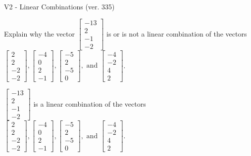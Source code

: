 \begin{exercise}
  \begin{exerciseTitle}V2 - Linear Combinations (ver. 335)\end{exerciseTitle}
  \begin{exerciseStatement}
    Explain why the vector \(\left[\begin{array}{c}
-13 \\
2 \\
-1 \\
-2
\end{array}\right]\)  is or is not a linear 
	combination of the vectors \(\left[\begin{array}{c}
2 \\
2 \\
-2 \\
-2
\end{array}\right] , \left[\begin{array}{c}
-4 \\
0 \\
2 \\
-1
\end{array}\right] , \left[\begin{array}{c}
-5 \\
2 \\
-5 \\
0
\end{array}\right] , \text{ and } \left[\begin{array}{c}
-4 \\
-2 \\
4 \\
2
\end{array}\right]\).
	


  \end{exerciseStatement}
  \begin{exerciseAnswer}
   \(\left[\begin{array}{c}
-13 \\
2 \\
-1 \\
-2
\end{array}\right]\) 
  	 is  
	a linear combination of the vectors \(\left[\begin{array}{c}
2 \\
2 \\
-2 \\
-2
\end{array}\right] , \left[\begin{array}{c}
-4 \\
0 \\
2 \\
-1
\end{array}\right] , \left[\begin{array}{c}
-5 \\
2 \\
-5 \\
0
\end{array}\right] , \text{ and } \left[\begin{array}{c}
-4 \\
-2 \\
4 \\
2
\end{array}\right]\).


\end{exerciseAnswer}
\end{exercise}
